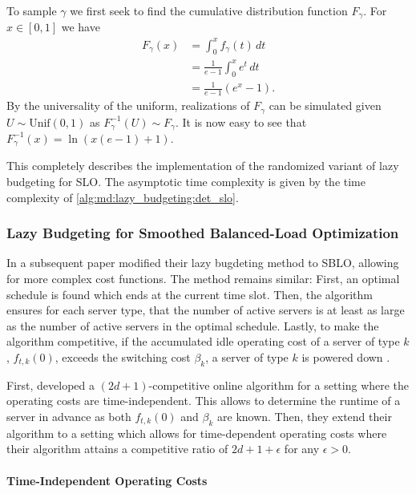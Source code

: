 To sample $\gamma$ we first seek to find the cumulative distribution function $F_{\gamma}$. For $x \in [0,1]$ we have \begin{align*}
    F_{\gamma}(x) &= \int_0^x f_{\gamma}(t) \,dt \\
                  &= \frac{1}{e-1} \int_0^x e^t \,dt \\
                  &= \frac{1}{e-1} (e^x - 1).
\end{align*} By the universality of the uniform, realizations of $F_{\gamma}$ can be simulated given $U \sim \text{Unif}(0,1)$ as $F_{\gamma}^{-1}(U) \sim F_{\gamma}$. It is now easy to see that $F_{\gamma}^{-1}(x) = \ln (x (e - 1) + 1)$.

This completely describes the implementation of the randomized variant of lazy budgeting for SLO. The asymptotic time complexity is given by the time complexity of \autoref{alg:md:lazy_budgeting:det_slo}.

\subsubsection{Lazy Budgeting for Smoothed Balanced-Load Optimization}

In a subsequent paper \citeauthor*{Albers2021_2} modified their lazy bugdeting method to SBLO, allowing for more complex cost functions. The method remains similar: First, an optimal schedule is found which ends at the current time slot. Then, the algorithm ensures for each server type, that the number of active servers is at least as large as the number of active servers in the optimal schedule. Lastly, to make the algorithm competitive, if the accumulated idle operating cost of a server of type $k$, $f_{t,k}(0)$, exceeds the switching cost $\beta_k$, a server of type $k$ is powered down \cite{Albers2021_2}.

First, \citeauthor*{Albers2021_2} developed a $(2d+1)$-competitive online algorithm for a setting where the operating costs are time-independent. This allows to determine the runtime of a server in advance as both $f_{t,k}(0)$ and $\beta_k$ are known. Then, they extend their algorithm to a setting which allows for time-dependent operating costs where their algorithm attains a competitive ratio of $2d+1+\epsilon$ for any $\epsilon > 0$.

\paragraph{Time-Independent Operating Costs}

